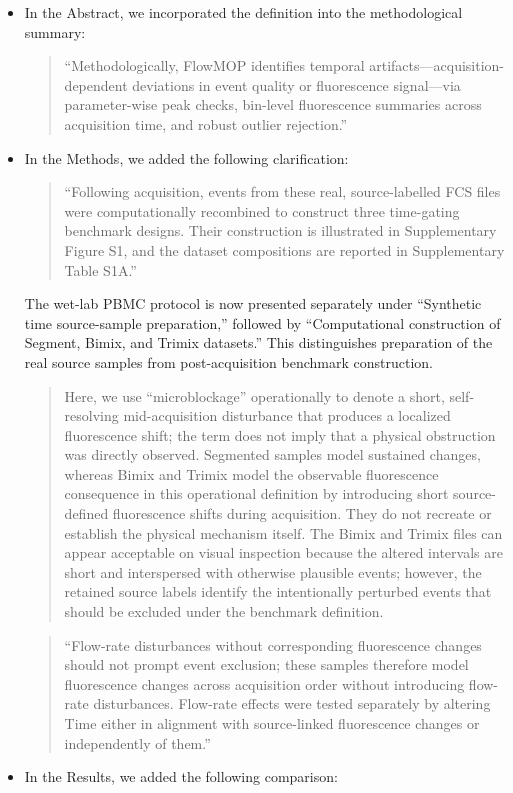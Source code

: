\documentclass[
  11pt,
  a4paper,
]{article}
\begin{document}
\begin{itemize}
\item
  In the Abstract, we incorporated the definition into the
  methodological summary:

  \begin{quote}
  ``Methodologically, FlowMOP identifies temporal
  artifacts---acquisition-dependent deviations in event quality or
  fluorescence signal---via parameter-wise peak checks, bin-level
  fluorescence summaries across acquisition time, and robust outlier
  rejection.''
  \end{quote}
\item
  In the Methods, we added the following clarification:

  \begin{quote}
  ``Following acquisition, events from these real, source-labelled FCS
  files were computationally recombined to construct three time-gating
  benchmark designs. Their construction is illustrated in Supplementary
  Figure S1, and the dataset compositions are reported in Supplementary
  Table S1A.''
  \end{quote}

  The wet-lab PBMC protocol is now presented separately under
  ``Synthetic time source-sample preparation,'' followed by
  ``Computational construction of Segment, Bimix, and Trimix datasets.''
  This distinguishes preparation of the real source samples from
  post-acquisition benchmark construction.

  \begin{quote}
  Here, we use ``microblockage'' operationally to denote a short,
  self-resolving mid-acquisition disturbance that produces a localized
  fluorescence shift; the term does not imply that a physical
  obstruction was directly observed. Segmented samples model sustained
  changes, whereas Bimix and Trimix model the observable fluorescence
  consequence in this operational definition by introducing short
  source-defined fluorescence shifts during acquisition. They do not
  recreate or establish the physical mechanism itself. The Bimix and
  Trimix files can appear acceptable on visual inspection because the
  altered intervals are short and interspersed with otherwise plausible
  events; however, the retained source labels identify the intentionally
  perturbed events that should be excluded under the benchmark
  definition.
  \end{quote}

  \begin{quote}
  ``Flow-rate disturbances without corresponding fluorescence changes
  should not prompt event exclusion; these samples therefore model
  fluorescence changes across acquisition order without introducing
  flow-rate disturbances. Flow-rate effects were tested separately by
  altering Time either in alignment with source-linked fluorescence
  changes or independently of them.''
  \end{quote}
\item
  In the Results, we added the following comparison:


\end{itemize}
\end{document}
